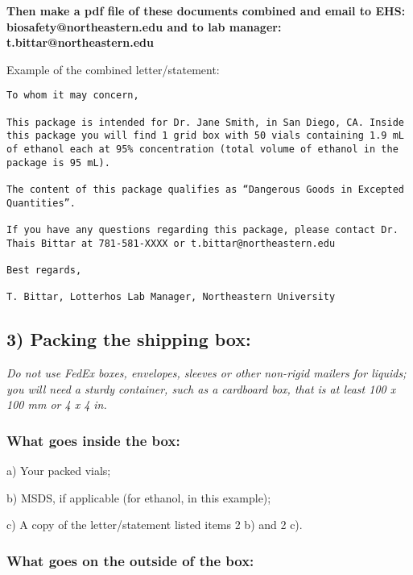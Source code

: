 \documentclass[
  letterpaper,
  DIV=11,
  numbers=noendperiod]{scrreprt}
\begin{document}
\textbf{Then make a pdf file of these documents combined and email to
EHS: biosafety@northeastern.edu and to lab manager:
t.bittar@northeastern.edu}

Example of the combined letter/statement:

\begin{verbatim}
To whom it may concern,
  
This package is intended for Dr. Jane Smith, in San Diego, CA. Inside this package you will find 1 grid box with 50 vials containing 1.9 mL of ethanol each at 95% concentration (total volume of ethanol in the package is 95 mL).

The content of this package qualifies as “Dangerous Goods in Excepted Quantities”.

If you have any questions regarding this package, please contact Dr. Thais Bittar at 781-581-XXXX or t.bittar@northeastern.edu
   
Best regards,

T. Bittar, Lotterhos Lab Manager, Northeastern University
\end{verbatim}

\hypertarget{packing-the-shipping-box}{%
\subsection*{\texorpdfstring{\textbf{3) Packing the shipping
box:}}{3) Packing the shipping box:}}\label{packing-the-shipping-box}}

\emph{Do not use FedEx boxes, envelopes, sleeves or other non-rigid
mailers for liquids; you will need a sturdy container, such as a
cardboard box, that is at least 100 x 100 mm or 4 x 4 in.}

\hypertarget{what-goes-inside-the-box}{%
\subsubsection*{\texorpdfstring{\textbf{What goes inside the
box:}}{What goes inside the box:}}\label{what-goes-inside-the-box}}

a) Your packed vials;

b) MSDS, if applicable (for ethanol, in this example);

c) A copy of the letter/statement listed items 2 b) and 2 c).

\hypertarget{what-goes-on-the-outside-of-the-box}{%
\subsubsection*{\texorpdfstring{\textbf{What goes on the outside of the
box:}}{What goes on the outside of the box:}}\label{what-goes-on-the-outside-of-the-box}}
\end{document}

